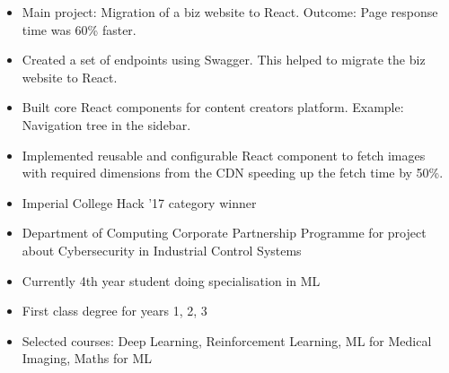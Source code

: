 \documentclass[10pt,a4paper,ragged2e]{altacv}
\begin{document}
\begin{itemize}
\item Main project: Migration of a biz website to React. Outcome: Page response time was 60\% faster.
\smallskip
\item Created a set of endpoints using Swagger. This helped to migrate the biz website to React.
\smallskip

\end{itemize}

\divider

\begin{itemize}
\item Built core React components for content creators platform. Example: Navigation tree in the sidebar.
\smallskip
\item Implemented reusable and configurable React component to fetch images with required dimensions from the CDN speeding up the fetch time by 50\%.
\end{itemize}


\smallskip
\begin{itemize}
\item Imperial College Hack ’17 category winner
\smallskip
\item Department of Computing Corporate Partnership Programme for project about Cybersecurity in Industrial Control Systems
\smallskip
\end{itemize}





\begin{itemize}
\item Currently 4th year student doing specialisation in ML
\smallskip
\item First class degree for years 1, 2, 3
\smallskip
\item Selected courses: Deep Learning, Reinforcement Learning, ML for Medical Imaging, Maths for ML
\end{itemize}
\end{document}
